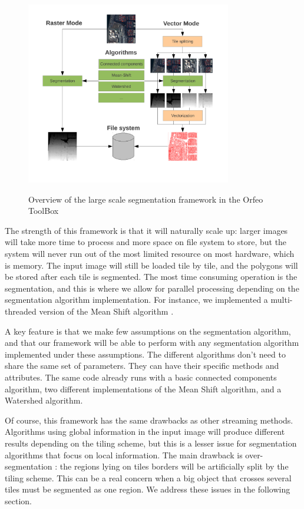 \documentclass{josis}
\begin{document}
\begin{figure}[!htb]
\centering
\includegraphics[width=0.8\textwidth]{Pictures/schema_ogrs}\label{fig:overview}
\caption{Overview of the large scale segmentation framework in the Orfeo ToolBox}
\end{figure}

The strength of this framework is that it will naturally scale up:
larger images will take more time to process and more space on file
system to store, but the system will never run out of the most limited
resource on most hardware, which is memory. The input image will still be
loaded tile by tile, and the polygons will be stored after each tile is
segmented. The most time consuming
operation is the segmentation, and this is where we allow for parallel
processing depending on the segmentation algorithm implementation. For
instance, we implemented a multi-threaded version of the Mean Shift
algorithm \cite{Comaniciu2002mean}.

A key feature is that we make few assumptions on the segmentation
algorithm, and that our framework will be able to perform with any
segmentation algorithm implemented under these assumptions. The
different algorithms don't need to share the same set of parameters. They
can have their specific methods and attributes. The same
code already runs with a basic connected components algorithm, two
different implementations of the Mean Shift algorithm, and a Watershed algorithm.

Of course, this framework has the same drawbacks as other streaming
methods. Algorithms using global information in the input image will
produce different results depending on the tiling scheme, but this is
a lesser issue for segmentation algorithms that focus on local information.
The main drawback is over-segmentation : the regions lying on tiles borders
will be artificially split by the tiling scheme. This can be a real concern
when a big object that crosses several tiles must be segmented as one region.
We address these issues in the following section.
\end{document}
